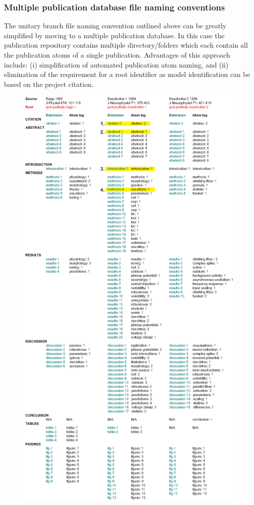 \documentclass[12pt]{article}
\begin{document}
\subsubsection*{Multiple publication database file naming conventions}

The unitary branch file naming convention outlined above can be greatly simplified by moving to a multiple publication database. In this case the publication repository contains multiple directory/folders which each contain all the publication atoms of a single publication. Advantages of this approach include: (i) simplification of automated publication atom naming, and (ii) elimination of the requirement for a root identifier as model identification can be based on the project citation.

\begin{figure}[h]
  \centering
   \includegraphics[scale=0.6]{figures/pub-overview.eps}

\end{figure}
\end{document}
